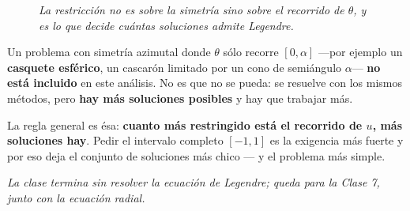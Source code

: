 \documentclass[12pt,a4paper]{article}
\begin{document}
\begin{figure}[H]
  \centering
  
  \caption*{\small\itshape La restricción no es sobre la simetría sino sobre el
  recorrido de $\theta$, y es lo que decide cuántas soluciones admite Legendre.}
\end{figure}

\begin{notebox}
Un problema con simetría azimutal donde $\theta$ sólo recorre $[0,\alpha]$ ---por
ejemplo un \textbf{casquete esférico}, un cascarón limitado por un cono de
semiángulo $\alpha$--- \textbf{no está incluido} en este análisis. No es que no se
pueda: se resuelve con los mismos métodos, pero \textbf{hay más soluciones
posibles} y hay que trabajar más.

La regla general es ésa: \textbf{cuanto más restringido está el recorrido de $u$,
más soluciones hay}. Pedir el intervalo completo $[-1,1]$ es la exigencia más
fuerte y por eso deja el conjunto de soluciones más chico --- y el problema más
simple.
\end{notebox}

\bigskip
\noindent\emph{La clase termina sin resolver la ecuación de Legendre; queda para
la Clase 7, junto con la ecuación radial.}
\end{document}
